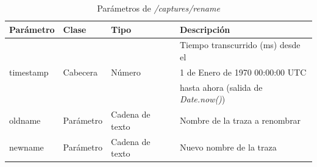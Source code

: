 \begin{table}[H]
\centering
\begin{tabular}{|l|l|l|l|}
\hline
\rowcolor[HTML]{F5F5F5}
\textbf{Parámetro}  & \textbf{Clase} & \textbf{Tipo}   & \textbf{Descripción}                        \\ \hline
                    &                &                 & Tiempo transcurrido (ms) desde el           \\
timestamp           & Cabecera       & Número          & 1 de Enero de 1970 00:00:00 UTC             \\
                    &                &                 & hasta ahora (salida de \textit{Date.now()}) \\ \hline
oldname             & Parámetro      & Cadena de texto & Nombre de la \gls{traza} a renombrar        \\ \hline
newname             & Parámetro      & Cadena de texto & Nuevo nombre de la \gls{traza}              \\ \hline
\end{tabular}
\caption{Parámetros de \textit{/captures/rename}}
\label{extra:api:capturesrename:invocacion}
\end{table}

